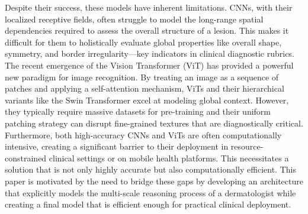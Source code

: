 Despite their success, these models have inherent limitations. CNNs, with their localized receptive fields, often struggle to model the long-range spatial dependencies required to assess the overall structure of a lesion. This makes it difficult for them to holistically evaluate global properties like overall shape, symmetry, and border irregularity—key indicators in clinical diagnostic rubrics. The recent emergence of the Vision Transformer (ViT) \cite{dosovitskiy2021vit} has provided a powerful new paradigm for image recognition. By treating an image as a sequence of patches and applying a self-attention mechanism, ViTs and their hierarchical variants like the Swin Transformer excel at modeling global context. However, they typically require massive datasets for pre-training and their uniform patching strategy can disrupt fine-grained textures that are diagnostically critical. Furthermore, both high-accuracy CNNs and ViTs are often computationally intensive, creating a significant barrier to their deployment in resource-constrained clinical settings or on mobile health platforms. This necessitates a solution that is not only highly accurate but also computationally efficient. This paper is motivated by the need to bridge these gaps by developing an architecture that explicitly models the multi-scale reasoning process of a dermatologist while creating a final model that is efficient enough for practical clinical deployment.